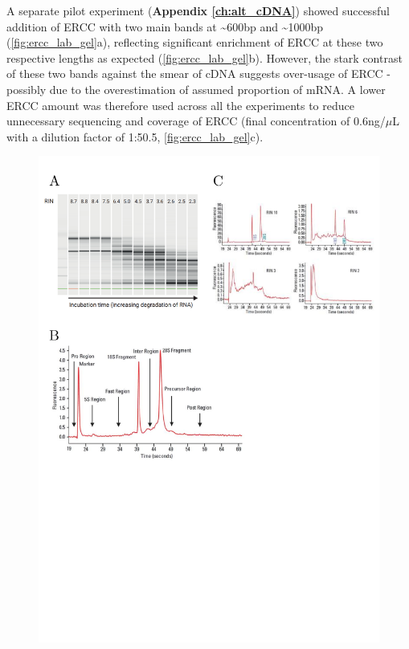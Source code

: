 A separate pilot experiment (\textbf{Appendix \ref{ch:alt_cDNA}}) showed successful addition of ERCC with two main bands at \textasciitilde600bp and \textasciitilde1000bp (\cref{fig:ercc_lab_gel}a), reflecting significant enrichment of ERCC at these two respective lengths as expected (\cref{fig:ercc_lab_gel}b). However, the stark contrast of these two bands against the smear of cDNA suggests over-usage of ERCC - possibly due to the overestimation of assumed proportion of mRNA. A lower ERCC amount was therefore used across all the experiments to reduce unnecessary sequencing and coverage of ERCC (final concentration of 0.6ng/$\mu$L with a dilution factor of 1:50.5, \cref{fig:ercc_lab_gel}c). 

\vspace{1cm}
\begin{figure}[!htp]
	\begin{center}
		\includegraphics[page=4,trim={0 8cm 0 1cm},clip,scale = 0.65]{Figures/General_Methodology_Figures.pdf}

\end{center}
\end{figure}
